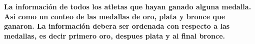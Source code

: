 \textbf{La información de todos los atletas que hayan ganado alguna medalla. Asi como un conteo de las medallas
de oro, plata y bronce que ganaron. La información debera ser ordenada con respecto a las medallas, es
decir primero oro, despues plata y al final bronce.}\vspace{.3cm}